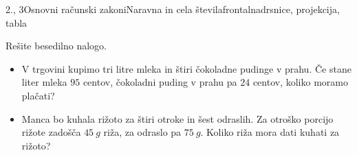 \begin{priprava}{2., 3}{}{Osnovni računski zakoni}{Naravna in cela števila}{frontalna}{drsnice, projekcija, tabla}
    \begin{naloga}
       Rešite besedilno nalogo.
       \begin{itemize}
           \item V trgovini kupimo tri litre mleka in štiri čokoladne pudinge v prahu. Če stane liter mleka $95$ centov,
               čokoladni puding v prahu pa $24$ centov, koliko moramo plačati? 
           \item Manca bo kuhala rižoto za štiri otroke in šest odraslih. Za otroško porcijo rižote zadošča $45~g$ riža,
               za odraslo pa $75~g$. Koliko riža mora dati kuhati za rižoto? 
       \end{itemize}
    \end{naloga}


\end{priprava}